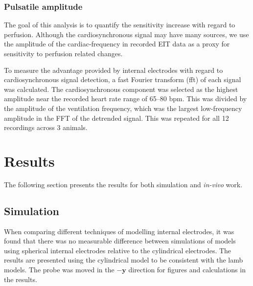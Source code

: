 \subsubsection{Pulsatile amplitude}
The goal of this analysis is to quantify the sensitivity increase with regard to perfusion. 
Although the cardiosynchronous signal may have many sources, we use the 
amplitude of the cardiac-frequency in recorded EIT data as a proxy for sensitivity to 
perfusion related changes. 

To measure the advantage provided by internal electrodes with regard to cardiosynchronous
signal detection, 
a fast Fourier transform (\acrshort{fft}) of each signal was calculated. 
The cardiosynchronous component was selected as the highest 
amplitude near the recorded heart rate range of 65--80 bpm.
This was divided by the amplitude of the ventilation frequency, which was the largest
low-frequency amplitude in the FFT of the detrended signal. 
This was repeated for all 12 recordings across 3 animals.

\section{Results}
The following section presents the results for both simulation and 
\emph{in-vivo} work.

\subsection{Simulation}
When comparing different techniques of modelling internal electrodes, 
it was found that there was no measurable difference between 
simulations of models using spherical internal electrodes 
relative to the
cylindrical electrodes. The results are presented
using the cylindrical model to be consistent with the 
lamb models.
The probe was moved in the $-\mathbf{y}$ direction for figures and calculations
in the results.


